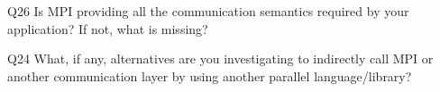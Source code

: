 \begin{description}%
\item{Q26} Is MPI providing all the communication semantics required by your application? If not, what is missing?%
\item{Q24} What, if any, alternatives are you investigating to indirectly call MPI or another communication layer by using another parallel language/library?%
\end{description}%
